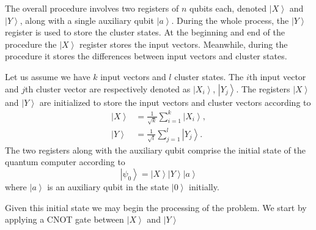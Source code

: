 \documentclass[pra,showkeys,twocolumn,showpacs]{revtex4-1}
\begin{document}
The overall procedure involves two registers of $n$ qubits each, denoted $\left| X \right\rangle$ and $\left| Y \right\rangle$, along with a single auxiliary qubit $\left| a \right\rangle$. 
During the whole process, the $\left| Y \right\rangle$ register is used to store the cluster states.  
At the beginning and end of the procedure the $\left| X \right\rangle$ register stores the input vectors.  
Meanwhile, during the procedure it stores the differences between input vectors and cluster states.

Let us assume we have $k$ input vectors and $l$ cluster states. 
The $i$th input vector and $j$th cluster vector are respectively denoted as $\left| X_i \right\rangle$, $\left| Y_j \right\rangle$. 
The registers $\left| X \right\rangle$ and $\left| Y \right\rangle$ are initialized to store the input vectors and cluster vectors according to
%
\begin{align}
    \left| X \right\rangle  & = \frac{1}{\sqrt{k}} \sum\limits_{i=1}^{k} \left| X_i \right\rangle,  \\
    \left| Y \right\rangle&  = \frac{1}{\sqrt{l}} \sum\limits_{j=1}^{l} \left| Y_j \right\rangle .
    \label{eq:encodnig}
\end{align}
% 
The two registers along with the auxiliary qubit comprise the initial state of the quantum computer according to
%
\begin{equation} 
\left| \psi_0 \right\rangle = 
    \left| X \right\rangle
    \left| Y \right\rangle 
    \left| a \right\rangle
    \label{eq:initial_state}
\end{equation}
%
where $\left| a \right\rangle$ is an auxiliary qubit in the state $\left| 0 \right\rangle$ initially.

Given this initial state we may begin the processing of the problem. We start by applying a CNOT gate between $\left| X \right\rangle$ and $\left| Y \right\rangle$
\end{document}
